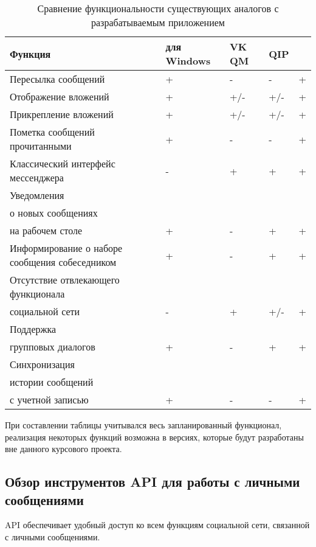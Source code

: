 \begin{table}[h] \caption{Сравнение функциональности существующих аналогов с
разрабатываемым приложением \vkapp{}}
\label{table:functions_comparing}
\centering
     \begin{tabular}{ | >{\centering}m{} 
					  | >{\centering}m{} 
					  | >{\centering}m{} 
					  | >{\centering}m{}
					  | >{\centering\arraybackslash}m{}|}
	\hline Функция & \vk{} для Windows & VK QM & QIP & \textbf{\vkapp{}}\\
  	\hline Пересылка сообщений & + & - & - & +\\
  	\hline Отображение вложений & + & +/- & +/- & +\\
  	\hline Прикрепление вложений & + & +/- & +/- & +\\
  	\hline Пометка сообщений прочитанными & + & - & - & +\\
  	\hline Классический интерфейс мессенджера & - & + & + & +\\
  	\hline Уведомления \\ о новых сообщениях \\ на рабочем столе  & + & - & + &
  	+\\
  	\hline Информирование о наборе сообщения собеседником & + & - & + & +\\
  	\hline Отсутствие отвлекающего функционала \\ социальной сети & - & + & +/- &
  	+
  	\\
  	\hline Поддержка \\ групповых диалогов & + & - & + & + \\
  	\hline Синхронизация \\ истории сообщений \\ с учетной записью & + & - & - &
  	+
  	\\
  	\hline
  \end{tabular}
\end{table}

При составлении таблицы учитывался
весь запланированный функционал, реализация некоторых функций возможна в
версиях, которые будут разработаны вне данного курсового проекта.

\subsection{Обзор инструментов API \vk{} для работы с личными сообщениями}
\label{sec:vk_api_description}

API \vk{} обеспечивает удобный доступ ко всем функциям
социальной сети, связанной с личными сообщениями. 

